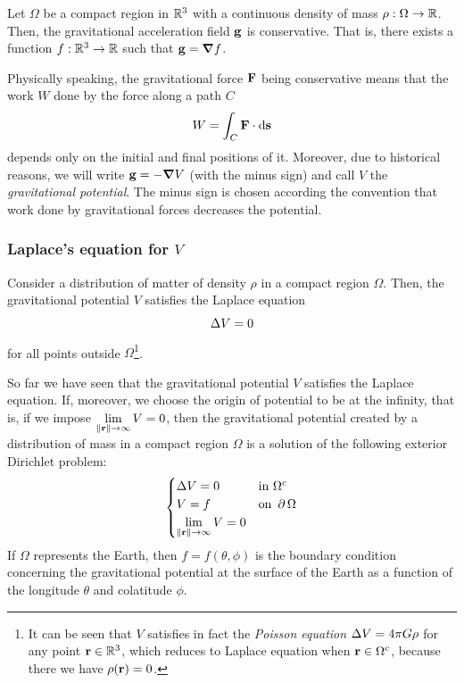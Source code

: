 \documentclass[../main.tex]{subfiles}
\begin{document}
\begin{theorem}\label{thm:conservative}
  Let $\Omega$ be a compact region in $\mathbb{R}^3$ with a continuous density of mass $\rho:\Omega\to\mathbb{R}$. Then, the gravitational acceleration field $\boldsymbol{\mathrm{g}}$ is conservative. That is, there exists a function $f:\mathbb{R}^3\rightarrow\mathbb{R}$ such that $\boldsymbol{\mathrm{g}}=\grad f$.
\end{theorem}
Physically speaking, the gravitational force $\boldsymbol{\mathrm{F}}$ being conservative means that the work $W$ done by the force along a path $C$
\begin{equation}
  W=\int_C\boldsymbol{\mathrm{F}}\cdot\dd{\boldsymbol{\mathrm{s}}}
\end{equation}
depends only on the initial and final positions of it. Moreover, due to historical reasons, we will write $\boldsymbol{\mathrm{g}}=-\grad V$ (with the minus sign) and call $V$ the \emph{gravitational potential}. The minus sign is chosen according the convention that work done by gravitational forces decreases the potential.
\subsubsection{Laplace's equation for \texorpdfstring{$V$}{V}}
\begin{theorem}
  Consider a distribution of matter of density $\rho$ in a compact region $\Omega$. Then, the gravitational potential $V$ satisfies the Laplace equation
  \begin{equation}
    \Delta V = 0
  \end{equation}
  for all points outside $\Omega$\footnote{It can be seen that $V$ satisfies in fact the \emph{Poisson equation} $\Delta V=4\pi G\rho$ for any point $\boldsymbol{\mathrm{r}}\in\mathbb{R}^3$, which reduces to Laplace equation when $\boldsymbol{\mathrm{r}}\in\Omega^c$, because there we have $\rho(\boldsymbol{\mathrm{r}})=0$.}.
\end{theorem}
So far we have seen that the gravitational potential $V$ satisfies the Laplace equation. If, moreover, we choose the origin of potential to be at the infinity, that is, if we impose $\displaystyle\lim_{\left\|\boldsymbol{\mathrm{r}}\right\|\to\infty}V=0$, then the gravitational potential created by a distribution of mass in a compact region $\Omega$ is a solution of the following exterior Dirichlet problem:
\begin{equation}\label{eq:dirichletProblem}
  \begin{cases}
    \Delta V = 0 & \text{in } \Omega^c    \\
    V = f            & \text{on } \operatorname{\partial}{\Omega} \\
    \displaystyle\lim_{\left\|\boldsymbol{\mathrm{r}}\right\|\to\infty}V=0
  \end{cases}
\end{equation}
If $\Omega$ represents the Earth, then $f=f(\theta,\phi)$ is the boundary condition concerning the gravitational potential at the surface of the Earth as a function of the longitude $\theta$ and colatitude $\phi$.
\end{document}
